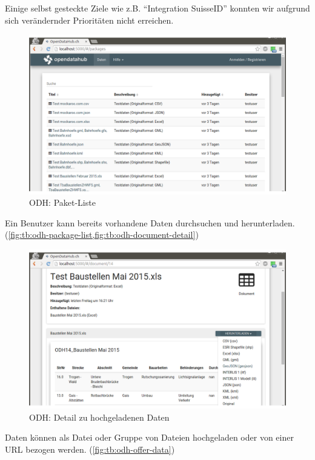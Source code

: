 Einige selbst gesteckte Ziele wie z.B. ``Integration SuisseID'' konnten wir aufgrund sich verändernder Prioritäten nicht erreichen.

\begin{figure}[H]
    \centering
    \includegraphics[width=2\linewidth/3]{fig/odh-package-list}
    \caption{ODH: Paket-Liste}
    \label{fig:tb:odh-package-list}
\end{figure}

Ein Benutzer kann bereits vorhandene Daten durchsuchen und herunterladen. 
(\cref{fig:tb:odh-package-list,fig:tb:odh-document-detail})
\begin{figure}[H]
    \centering
    \includegraphics[width=2\linewidth/3]{fig/odh-document-detail}
    \caption{ODH: Detail zu hochgeladenen Daten}
    \label{fig:tb:odh-document-detail}
\end{figure}

Daten können als Datei oder Gruppe von Dateien hochgeladen oder von einer URL bezogen werden. (\cref{fig:tb:odh-offer-data})

